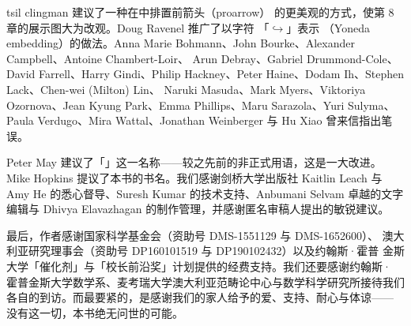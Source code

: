 tsil clingman 建议了一种在\trVirtualEquipment{}中排置前箭头（proarrow）
的更美观的方式，使第 8 章的展示图大为改观。Doug Ravenel 推广了以字符
「$\hookrightarrow$」表示 \trYonedaEmbedding{}（Yoneda embedding）的做法。Anna
Marie Bohmann、John Bourke、Alexander Campbell、Antoine Chambert-Loir、
Arun Debray、Gabriel Drummond-Cole、David Farrell、Harry Gindi、Philip
Hackney、Peter Haine、Dodam Ih、Stephen Lack、Chen-wei (Milton) Lin、
Naruki Masuda、Mark Myers、Viktoriya Ozornova、Jean Kyung Park、Emma
Phillips、Maru Sarazola、Yuri Sulyma、Paula Verdugo、Mira Wattal、Jonathan
Weinberger 与 Hu Xiao 曾来信指出笔误。

Peter May 建议了「\trInfinityCosmos」这一名称——较之先前的非正式用语，这是一大改进。
Mike Hopkins 提议了本书的书名。我们感谢剑桥大学出版社 Kaitlin Leach 与
Amy He 的悉心督导、Suresh Kumar 的技术支持、Anbumani Selvam 卓越的文字
编辑与 Dhivya Elavazhagan 的制作管理，并感谢匿名审稿人提出的敏锐建议。

最后，作者感谢国家科学基金会（资助号 DMS-1551129 与 DMS-1652600）、
澳大利亚研究理事会（资助号 DP160101519 与 DP190102432）以及约翰斯·霍普
金斯大学「催化剂」与「校长前沿奖」计划提供的经费支持。我们还要感谢约翰斯·
霍普金斯大学数学系、麦考瑞大学澳大利亚范畴论中心与数学科学研究所接待我们
各自的到访。而最要紧的，是感谢我们的家人给予的爱、支持、耐心与体谅——
没有这一切，本书绝无问世的可能。

